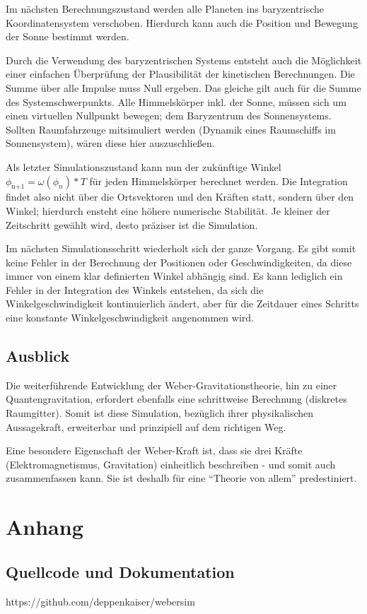 \documentclass{book}
\begin{document}
Im nächsten Berechnungszustand werden alle Planeten ins baryzentrische Koordinatensystem verschoben. Hierdurch kann auch die
Position und Bewegung der Sonne bestimmt werden.

Durch die Verwendung des baryzentrischen Systems entsteht auch die Möglichkeit einer einfachen Überprüfung der Plausibilität der
kinetischen Berechnungen. Die Summe über alle Impulse muss Null ergeben. Das gleiche gilt auch für die Summe des Systemschwerpunkts.
Alle Himmelskörper inkl. der Sonne, müssen sich um einen virtuellen Nullpunkt bewegen; dem Baryzentrum des Sonnensystems. Sollten
Raumfahrzeuge mitsimuliert werden (Dynamik eines Raumschiffs im Sonnensystem), wären diese hier auszuschließen.

Als letzter Simulationszustand kann nun der zukünftige Winkel $\phi_\text{n+1} = \omega(\phi_n) * T$ für jeden Himmelskörper
berechnet werden. Die Integration findet also nicht über die Ortsvektoren und den Kräften statt, sondern über den Winkel; hierdurch
ensteht eine höhere numerische Stabilität. Je kleiner der Zeitschritt gewählt wird, desto präziser ist die Simulation.

Im nächsten Simulationsschritt wiederholt sich der ganze Vorgang. Es gibt somit keine Fehler in der Berechnung der Positionen
oder Geschwindigkeiten, da diese immer von einem klar definierten Winkel abhängig sind. Es kann lediglich ein Fehler in der
Integration des Winkels entstehen, da sich die Winkelgeschwindigkeit kontinuierlich ändert, aber für die Zeitdauer eines Schritts
eine konstante Winkelgeschwindigkeit angenommen wird.

\section{Ausblick}
Die weiterführende Entwicklung der Weber-Gravitationstheorie, hin zu einer Quantengravitation, erfordert ebenfalls eine schrittweise
Berechnung (diskretes Raumgitter). Somit ist diese Simulation, bezüglich ihrer physikalischen Aussagekraft, erweiterbar und prinzipiell
auf dem richtigen Weg.

Eine besondere Eigenschaft der Weber-Kraft ist, dass sie drei Kräfte (Elektromagnetismus, Gravitation) einheitlich beschreiben - und
somit auch zusammenfassen kann. Sie ist deshalb für eine \enquote{Theorie von allem} predestiniert.

\chapter{Anhang}
\section{Quellcode und Dokumentation}
https://github.com/deppenkaiser/webersim
\end{document}
